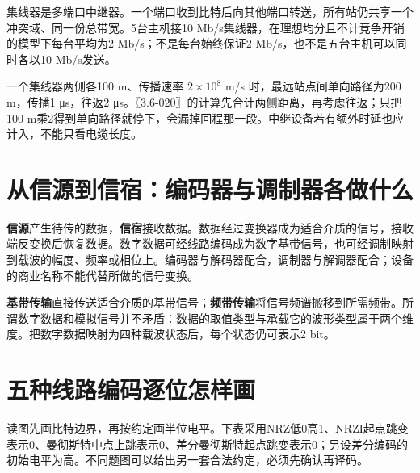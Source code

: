 集线器是多端口中继器。一个端口收到比特后向其他端口转送，所有站仍共享一个冲突域、同一份总带宽。5台主机接10 Mb/s集线器，在理想均分且不计竞争开销的模型下每台平均为2 Mb/s；不是每台始终保证2 Mb/s，也不是五台主机可以同时各以10 Mb/s发送。

一个集线器两侧各100 m、传播速率 \(2\times10^8\) m/s 时，最远站点间单向路径为200 m，传播1 μs，往返2 μs。〖3.6-020〗的计算先合计两侧距离，再考虑往返；只把100 m乘2得到单向路径就停下，会漏掉回程那一段。中继设备若有额外时延也应计入，不能只看电缆长度。

\section{从信源到信宿：编码器与调制器各做什么}\label{CN02-course-conversion}

\textbf{信源}产生待传的数据，\textbf{信宿}接收数据。数据经过变换器成为适合介质的信号，接收端反变换后恢复数据。数字数据可经线路编码成为数字基带信号，也可经调制映射到载波的幅度、频率或相位上。编码器与解码器配合，调制器与解调器配合；设备的商业名称不能代替所做的信号变换。

\textbf{基带传输}直接传送适合介质的基带信号；\textbf{频带传输}将信号频谱搬移到所需频带。所谓数字数据和模拟信号并不矛盾：数据的取值类型与承载它的波形类型属于两个维度。把数字数据映射为四种载波状态后，每个状态仍可表示2 bit。

\section{五种线路编码逐位怎样画}\label{CN02-course-codes}

读图先画比特边界，再按约定画半位电平。下表采用NRZ低0高1、NRZI起点跳变表示0、曼彻斯特中点上跳表示0、差分曼彻斯特起点跳变表示0；另设差分编码的初始电平为高。不同题图可以给出另一套合法约定，必须先确认再译码。

